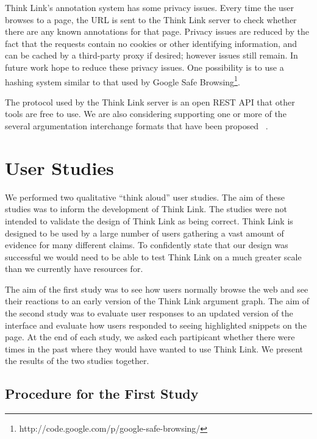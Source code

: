 \documentclass{chi2009}
\newcommand{\todo}[1]{}
\begin{document}
Think Link's annotation system has some privacy issues. Every time the user browses to a page, the URL is sent to the Think Link server to check whether there are any known annotations for that page. Privacy issues are reduced by the fact that the requests contain no cookies or other identifying information, and can be cached by a third-party proxy if desired; however issues still remain. In future work hope to reduce these privacy issues. One possibility is to use a hashing system similar to that used by Google Safe Browsing\footnote{http://code.google.com/p/google-safe-browsing/}.

The protocol used by the Think Link server is an open REST API that other tools are free to use. We are also considering supporting one or more of the several argumentation interchange formats that have been proposed ~\cite{Rahwan2007a,McGinnis2007}.


\section{User Studies}

We performed two qualitative ``think aloud'' user studies. The aim of these studies was to inform the development of Think Link. The studies were not intended to validate the design of Think Link as being correct. Think Link is designed to be used by a large number of users gathering a vast amount of evidence for many different claims. To confidently state that our design was successful we would need to be able to test Think Link on a much greater scale than we currently have resources for.

The aim of the first study was to see how users normally browse the web and see their reactions to an early version of the Think Link argument graph. The aim of the second study was to evaluate user responses to an updated version of the interface and evaluate how users responded to seeing highlighted snippets on the page. At the end of each study, we asked each partipicant whether there were times in the past where they would have wanted to use Think Link. We present the results of the two studies together.

\todo{Say something about final informal evaluation}


\subsection{Procedure for the First Study}
\end{document}
